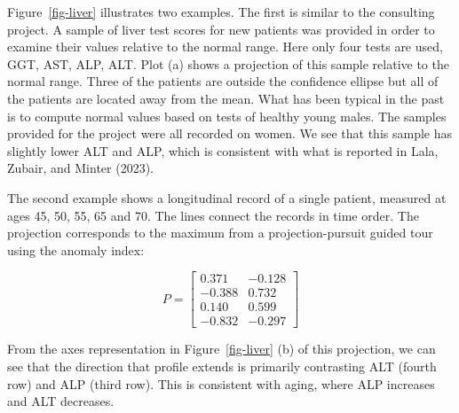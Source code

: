 \documentclass[
  12pt,
]{interact}
\begin{document}
Figure~\ref{fig-liver} illustrates two examples. The first is similar to
the consulting project. A sample of liver test scores for new patients
was provided in order to examine their values relative to the normal
range. Here only four tests are used, GGT, AST, ALP, ALT. Plot (a) shows
a projection of this sample relative to the normal range. Three of the
patients are outside the confidence ellipse but all of the patients are
located away from the mean. What has been typical in the past is to
compute normal values based on tests of healthy young males. The samples
provided for the project were all recorded on women. We see that this
sample has slightly lower ALT and ALP, which is consistent with what is
reported in Lala, Zubair, and Minter (2023).

The second example shows a longitudinal record of a single patient,
measured at ages 45, 50, 55, 65 and 70. The lines connect the records in
time order. The projection corresponds to the maximum from a
projection-pursuit guided tour using the anomaly index:

\[
P = \left[ \begin{array}{rr}
            0.371 & -0.128 \\
            -0.388 & 0.732 \\
            0.140 & 0.599 \\
            -0.832 & -0.297 
            \end{array} \right]
\]

From the axes representation in Figure~\ref{fig-liver} (b) of this
projection, we can see that the direction that profile extends is
primarily contrasting ALT (fourth row) and ALP (third row). This is
consistent with aging, where ALP increases and ALT decreases.
\end{document}
